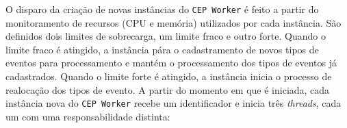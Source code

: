 O disparo da criação de novas instâncias do \texttt{CEP Worker} é feito a partir do monitoramento de recursos (CPU e memória) utilizados por cada instância. São definidos dois limites de sobrecarga, um limite fraco e outro forte. Quando o limite fraco é atingido, a instância pára o cadastramento de novos tipos de eventos para processamento e mantém o processamento dos tipos de eventos já cadastrados. Quando o limite forte é atingido, a instância inicia o processo de realocação dos tipos de evento. A partir do momento em que é iniciada, cada instância nova do \texttt{CEP Worker} recebe um identificador e inicia três \textit{threads}, cada um com uma responsabilidade distinta: 



